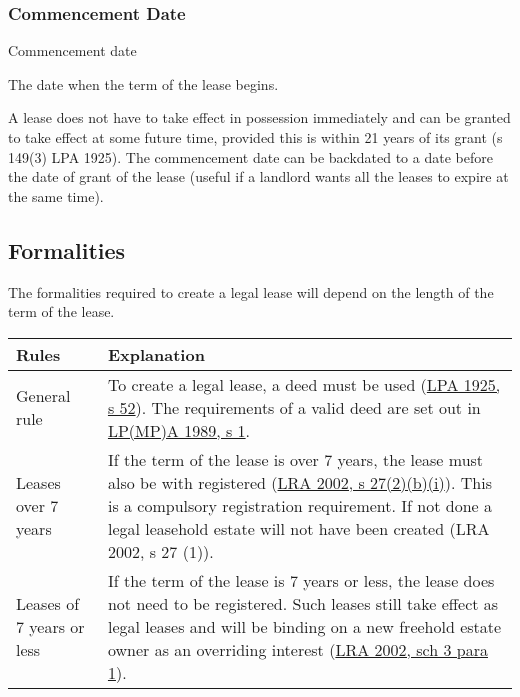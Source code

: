 \documentclass[
]{article}
\newenvironment{env-ab392b14-a05f-4d9a-80eb-a63d00eb59ea}
{
    \savenotes\tcolorbox[blanker,breakable,left=5pt,borderline west={2pt}{-4pt}{gold}]
}
{
    \endtcolorbox\spewnotes
}
\begin{document}
\hypertarget{commencement-date}{%
\subsubsection{Commencement Date}\label{commencement-date}}

\begin{env-ab392b14-a05f-4d9a-80eb-a63d00eb59ea}

Commencement date

The date when the term of the lease begins.

\end{env-ab392b14-a05f-4d9a-80eb-a63d00eb59ea}

A lease does not have to take effect in possession immediately and can
be granted to take effect at some future time, provided this is within
21 years of its grant (s 149(3) LPA 1925). The commencement date can be
backdated to a date before the date of grant of the lease (useful if a
landlord wants all the leases to expire at the same time).

\hypertarget{formalities}{%
\subsection{Formalities}\label{formalities}}

The formalities required to create a legal lease will depend on the
length of the term of the lease.

\begin{longtable}[]{@{}ll@{}}
\toprule()
Rules & Explanation \\
\midrule()
\endhead
General rule & To create a legal lease, a deed must be used
(\href{https://www.legislation.gov.uk/ukpga/Geo5/15-16/20/section/52}{LPA
1925, s 52}). The requirements of a valid deed are set out in
\href{https://www.legislation.gov.uk/ukpga/1989/34/section/1}{LP(MP)A
1989, s 1}. \\
Leases over 7 years & If the term of the lease is over 7 years, the
lease must also be with registered
(\href{https://www.legislation.gov.uk/ukpga/2002/9/section/27}{LRA 2002,
s 27(2)(b)(i)}). This is a compulsory registration requirement. If not
done a legal leasehold estate will not have been created (LRA 2002, s 27
(1)). \\
Leases of 7 years or less & If the term of the lease is 7 years or less,
the lease does not need to be registered. Such leases still take effect
as legal leases and will be binding on a new freehold estate owner as an
overriding interest
(\href{https://www.legislation.gov.uk/ukpga/2002/9/schedule/3}{LRA 2002,
sch 3 para 1}). \\
\bottomrule()
\end{longtable}
\end{document}

